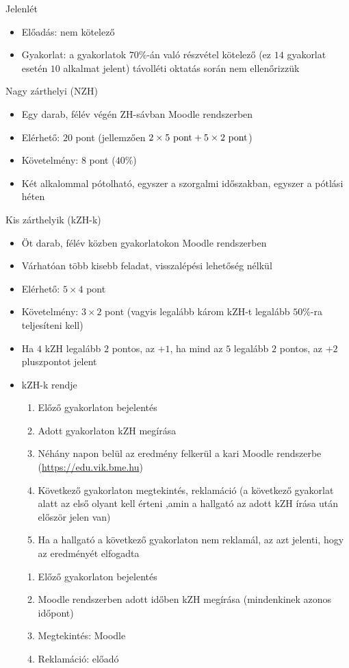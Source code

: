 \documentclass[a4paper,12pt]{article}
\newcommand{\jelenlet}{\color{gray}}
\newcommand{\tavollet}{\color{red}}
\begin{document}
	Jelenlét
	\begin{itemize}
		\item Előadás: nem kötelező
		\item Gyakorlat: {\jelenlet a gyakorlatok $70\%$-án való részvétel kötelező (ez $14$ gyakorlat esetén $10$ alkalmat jelent)} {\tavollet távolléti oktatás során nem ellenőrizzük}
	\end{itemize}
	Nagy zárthelyi (NZH)
	\begin{itemize}
		\item Egy darab, félév végén {\jelenlet ZH-sávban} {\tavollet Moodle rendszerben}
		\item Elérhető: $20$ pont (jellemzően $2\times5 \textnormal{ pont}+5\times2\textnormal{ pont}$)
		\item Követelmény: $8$ pont ($40\%$)
		\item Két alkalommal pótolható, egyszer a szorgalmi időszakban, egyszer a pótlási héten
	\end{itemize}
	Kis zárthelyik (kZH-k)
	\begin{itemize}
		\item Öt darab, félév közben {\jelenlet gyakorlatokon} {\tavollet Moodle rendszerben}
		\item {\tavollet Várhatóan több kisebb feladat, visszalépési lehetőség nélkül}
		\item Elérhető: $5\times4$ pont
		\item Követelmény: $3\times2$ pont (vagyis legalább károm kZH-t legalább $50\%$-ra teljesíteni kell)
		\item Ha $4$ kZH legalább $2$ pontos, az $+1$, ha mind az $5$ legalább $2$ pontos, az $+2$ pluszpontot jelent
		\item kZH-k rendje
		{\jelenlet\begin{enumerate}
			\item Előző gyakorlaton bejelentés
			\item Adott gyakorlaton kZH megírása
			\item Néhány napon belül az eredmény felkerül a kari Moodle rendszerbe (\url{https://edu.vik.bme.hu})
			\item Következő gyakorlaton megtekintés, reklamáció (a következő gyakorlat alatt az első olyant kell érteni ,amin a hallgató az adott kZH írása után először jelen van)
			\item Ha a hallgató a következő gyakorlaton nem reklamál, az azt jelenti, hogy az eredményét elfogadta
		\end{enumerate}}
		{\tavollet\begin{enumerate}
			\item Előző gyakorlaton bejelentés
			\item Moodle rendszerben adott időben kZH megírása (mindenkinek azonos időpont)
			\item Megtekintés: Moodle
			\item Reklamáció: előadó
		\end{enumerate}}
	\end{itemize}
\end{document}
